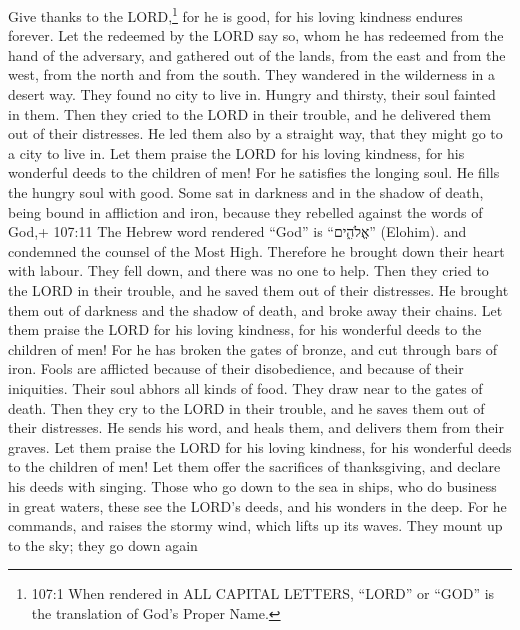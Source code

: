  Give thanks to the LORD,\footnote{107:1 When rendered in
  ALL CAPITAL LETTERS, ``LORD'' or ``GOD'' is the translation of God's
  Proper Name.} for he is good, for his loving kindness endures forever.
 Let the redeemed by the LORD say so, whom he has redeemed
from the hand of the adversary,  and gathered out of the
lands, from the east and from the west, from the north and from the
south.  They wandered in the wilderness in a desert way.
They found no city to live in.  Hungry and thirsty, their
soul fainted in them.  Then they cried to the LORD in their
trouble, and he delivered them out of their distresses.  He
led them also by a straight way, that they might go to a city to live
in.  Let them praise the LORD for his loving kindness, for
his wonderful deeds to the children of men!  For he
satisfies the longing soul. He fills the hungry soul with good.
 Some sat in darkness and in the shadow of death, being
bound in affliction and iron,  because they rebelled
against the words of God,+ 107:11 The Hebrew word rendered ``God'' is
``אֱלֹהִ֑ים'' (Elohim). and condemned the counsel of the Most High.
 Therefore he brought down their heart with labour. They
fell down, and there was no one to help.  Then they cried
to the LORD in their trouble, and he saved them out of their distresses.
 He brought them out of darkness and the shadow of death,
and broke away their chains.  Let them praise the LORD for
his loving kindness, for his wonderful deeds to the children of men!
 For he has broken the gates of bronze, and cut through
bars of iron.  Fools are afflicted because of their
disobedience, and because of their iniquities.  Their soul
abhors all kinds of food. They draw near to the gates of death.
 Then they cry to the LORD in their trouble, and he saves
them out of their distresses.  He sends his word, and heals
them, and delivers them from their graves.  Let them praise
the LORD for his loving kindness, for his wonderful deeds to the
children of men!  Let them offer the sacrifices of
thanksgiving, and declare his deeds with singing.  Those
who go down to the sea in ships, who do business in great waters,
 these see the LORD's deeds, and his wonders in the deep.
 For he commands, and raises the stormy wind, which lifts
up its waves.  They mount up to the sky; they go down again

